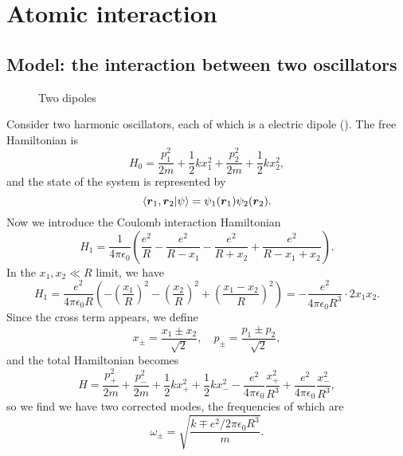 \documentclass[hyperref, a4paper]{article}
\begin{document}
\section{Atomic interaction}

\subsection{Model: the interaction between two oscillators}

\begin{figure}
    \centering
    
    \caption{Two dipoles}
    \label{fig:two-dipole-1}
\end{figure}

Consider two harmonic oscillators, 
each of which is a electric dipole ().
The free Hamiltonian is
\begin{equation}
    H_0 = \frac{p_1^2}{2m} + \frac{1}{2} k x_1^2 + 
    \frac{p_2^2}{2m} + \frac{1}{2} k x_2^2,
    \label{eq:unperturbed-oscillators}
\end{equation}
and the state of the system is represented by 
\begin{equation}
    \braket{\vb*{r}_1, \vb*{r}_2}{\psi} = \psi_1(\vb*{r}_1) \psi_2(\vb*{r}_2).
\end{equation}
Now we introduce the Coulomb interaction Hamiltonian 
\begin{equation}
    H_1 = \frac{1}{4 \pi \epsilon_0} \left(
        \frac{e^2}{R} - \frac{e^2}{R - x_1} - \frac{e^2}{R + x_2} + \frac{e^2}{R - x_1 + x_2}
    \right).
\end{equation}
In the $x_1, x_2 \ll R$ limit, 
we have 
\begin{equation}
    H_1 = \frac{e^2}{4 \pi \epsilon_0 R} \left(
        - \left(\frac{x_1}{R}\right)^2
        - \left(\frac{x_2}{R}\right)^2 
        + \left(\frac{x_1 - x_2}{R}\right)^2
    \right)
    = - \frac{e^2}{4 \pi \epsilon_0 R^3} \cdot 2 x_1 x_2 .
    \label{eq:x1x2-interaction}
\end{equation}
Since the cross term appears, 
we define 
\begin{equation}
    x_\pm = \frac{x_1 \pm x_2}{\sqrt{2}}, \quad 
    p_\pm = \frac{p_1 \pm p_2}{\sqrt{2}},
    \label{eq:x-p-pm}
\end{equation}
and the total Hamiltonian becomes 
\begin{equation}
    H = \frac{p_+^2}{2m} + \frac{p_-^2}{2m} + \frac{1}{2} k x_+^2 + \frac{1}{2} k x_-^2 
    - \frac{e^2}{4 \pi \epsilon_0} \frac{x_+^2}{R^3} 
    + \frac{e^2}{4 \pi \epsilon_0} \frac{x_-^2}{R^3},
\end{equation}
so we find we have two corrected modes,
the frequencies of which are
\begin{equation}
    \omega_\pm = \sqrt{
        \frac{k \mp e^2 / 2 \pi \epsilon_0 R^3}{m}
    }.
\end{equation}
\end{document}

